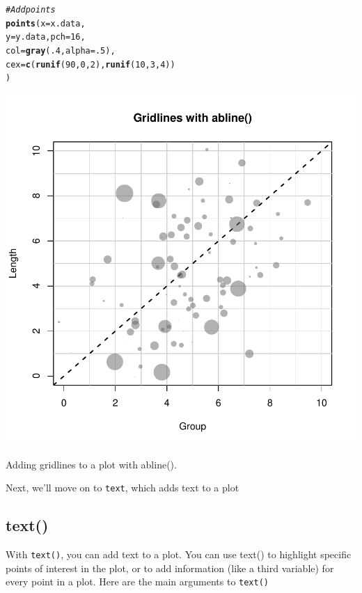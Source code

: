 \documentclass{tufte-book}\usepackage[]{graphicx}\usepackage[]{color}
\makeatletter
\def\maxwidth{ %
  \ifdim\Gin@nat@width>\linewidth
    \linewidth
  \else
    \Gin@nat@width
  \fi
}
\newcommand{\hlnum}[1]{\textcolor[rgb]{0.686,0.059,0.569}{#1}}%
\newcommand{\hlcom}[1]{\textcolor[rgb]{0.678,0.584,0.686}{\textit{#1}}}%
\newcommand{\hlstd}[1]{\textcolor[rgb]{0.345,0.345,0.345}{#1}}%
\newcommand{\hlkwc}[1]{\textcolor[rgb]{0.333,0.667,0.333}{#1}}%
\newcommand{\hlkwd}[1]{\textcolor[rgb]{0.737,0.353,0.396}{\textbf{#1}}}%
\newenvironment{kframe}{%
 \def\at@end@of@kframe{}%
 \ifinner\ifhmode%
  \def\at@end@of@kframe{\end{minipage}}%
  \begin{minipage}{\columnwidth}%
 \fi\fi%
 \def\FrameCommand##1{\hskip\@totalleftmargin \hskip-\fboxsep
 \colorbox{shadecolor}{##1}\hskip-\fboxsep
     \hskip-\linewidth \hskip-\@totalleftmargin \hskip\columnwidth}%
 \MakeFramed {\advance\hsize-\width
   \@totalleftmargin\z@ \linewidth\hsize
   \@setminipage}}%
 {\par\unskip\endMakeFramed%
 \at@end@of@kframe}
\newenvironment{knitrout}{}{} %
\makeatother
\begin{document}
\begin{footnotesize}
\begin{marginfigure}
\begin{tiny}
\begin{knitrout}
\begin{kframe}
\begin{alltt}
\hlcom{# Add points}
\hlkwd{points}\hlstd{(}\hlkwc{x} \hlstd{= x.data,}
       \hlkwc{y} \hlstd{= y.data,} \hlkwc{pch} \hlstd{=} \hlnum{16}\hlstd{,}
       \hlkwc{col} \hlstd{=} \hlkwd{gray}\hlstd{(}\hlnum{.4}\hlstd{,} \hlkwc{alpha} \hlstd{=} \hlnum{.5}\hlstd{),}
       \hlkwc{cex} \hlstd{=} \hlkwd{c}\hlstd{(}\hlkwd{runif}\hlstd{(}\hlnum{90}\hlstd{,} \hlnum{0}\hlstd{,} \hlnum{2}\hlstd{),} \hlkwd{runif}\hlstd{(}\hlnum{10}\hlstd{,} \hlnum{3}\hlstd{,} \hlnum{4}\hlstd{))}
       \hlstd{)}
\end{alltt}
\end{kframe}
\includegraphics[width=\maxwidth]{figure/unnamed-chunk-159-1} 

\end{knitrout}
\caption{Adding gridlines to a plot with abline().}
\label{fig:gridlinesexample}
\end{tiny}
\end{marginfigure}

Next, we'll move on to \texttt{text}, which adds text to a plot

\subsection{text()}

With \texttt{text()}, you can add text to a plot. You can use text() to highlight specific points of interest in the plot, or to add information (like a third variable) for every point in a plot. Here are the main arguments to \texttt{text()}





\end{footnotesize}
\end{document}
